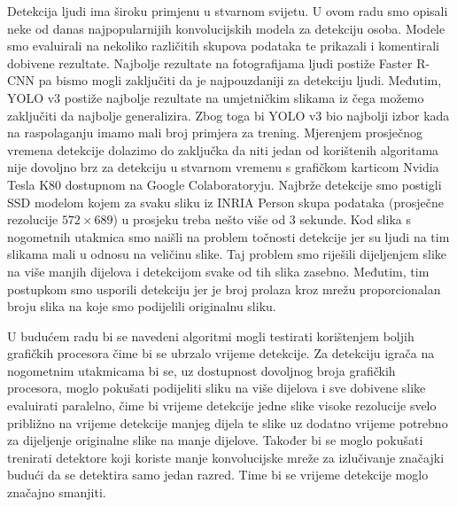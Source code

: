 Detekcija ljudi ima široku primjenu u stvarnom svijetu. U ovom radu smo opisali neke od danas najpopularnijih konvolucijskih modela za detekciju osoba. Modele smo evaluirali na nekoliko različitih skupova podataka te prikazali i komentirali dobivene rezultate. Najbolje rezultate na fotografijama ljudi postiže Faster R-CNN pa bismo mogli zaključiti da je najpouzdaniji za detekciju ljudi. Međutim, YOLO v3 postiže najbolje rezultate na umjetničkim slikama iz čega možemo zaključiti da najbolje generalizira. Zbog toga bi YOLO v3 bio najbolji izbor kada na raspolaganju imamo mali broj primjera za trening.
Mjerenjem prosječnog vremena detekcije dolazimo do zaključka da niti jedan od korištenih algoritama nije dovoljno brz za detekciju u stvarnom vremenu s grafičkom karticom Nvidia Tesla K80 dostupnom na Google Colaboratoryju. Najbrže detekcije smo postigli SSD modelom kojem za svaku sliku iz INRIA Person skupa podataka (prosječne rezolucije $572 \times 689$) u prosjeku treba nešto više od 3 sekunde. Kod slika s nogometnih utakmica smo naišli na problem točnosti detekcije jer su ljudi na tim slikama mali u odnosu na veličinu slike. Taj problem smo riješili dijeljenjem slike na više manjih dijelova i detekcijom svake od tih slika zasebno. Međutim, tim postupkom smo usporili detekciju jer je broj prolaza kroz mrežu proporcionalan broju slika na koje smo podijelili originalnu sliku. 

U budućem radu bi se navedeni algoritmi mogli testirati korištenjem boljih grafičkih procesora čime bi se ubrzalo vrijeme detekcije. Za detekciju igrača na nogometnim utakmicama bi se, uz dostupnost dovoljnog broja grafičkih procesora, moglo pokušati podijeliti sliku na više dijelova i sve dobivene slike evaluirati paralelno, čime bi vrijeme detekcije jedne slike visoke rezolucije svelo približno na vrijeme detekcije manjeg dijela te slike uz dodatno vrijeme potrebno za dijeljenje originalne slike na manje dijelove. Također bi se moglo pokušati trenirati detektore koji koriste manje konvolucijske mreže za izlučivanje značajki budući da se detektira samo jedan razred. Time bi se vrijeme detekcije moglo značajno smanjiti.